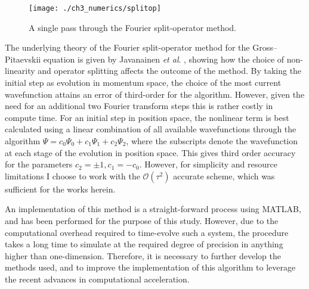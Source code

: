 \begin{figure}
    \centering
    \texttt{[image: ./ch3\_numerics/splitop]}
    \caption{A single pass through the Fourier split-operator method.}
    \label{fig:num_splitop}
\end{figure}

The underlying theory of the Fourier split-operator method for the Gross--Pitaevskii equation is given by Javanainen \textit{et al}. \cite{BEC:Javanainen_jphysa_2006}, showing how the choice of non-linearity and operator splitting affects the outcome of the method. By taking the initial step as evolution in momentum space, the choice of the most current wavefunction attains an error of third-order for the algorithm. However, given the need for an additional two Fourier transform steps this is rather costly in compute time. For an initial step in position space, the nonlinear term is best calculated using a linear combination of all available wavefunctions through the algorithm $\Psi = c_0\Psi_0 + c_1\Psi_1 + c_2\Psi_2$, where the subscripts denote the wavefunction at each stage of the evolution in position space. This gives third order accuracy for the parameters $c_2=\pm 1, c_1=-c_0$. However, for simplicity and resource limitations I choose to work with the $\mathcal{O}\left(\tau^2\right)$ accurate scheme, which was sufficient for the works herein.

An implementation of this method is a straight-forward process using MATLAB, and has been performed for the purpose of this study. However, due to the computational overhead required to time-evolve such a system, the procedure takes a long time to simulate at the required degree of precision in anything higher than one-dimension. Therefore, it is necessary to further develop the methods used, and to improve the implementation of this algorithm to leverage the recent advances in computational acceleration.


